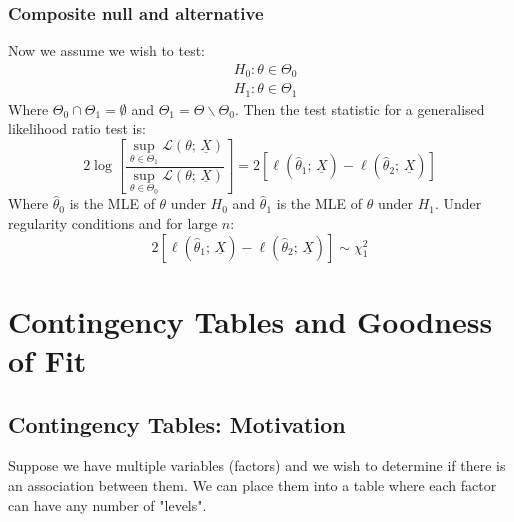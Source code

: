 \documentclass[12pt]{article}
\begin{document}
\subsubsection{Composite null and alternative}
Now we assume we wish to test:
\begin{align*}
    &H_0:\theta\in\Theta_0 \\
    &H_1:\theta\in\Theta_1
\end{align*}
Where \(\Theta_0\cap\Theta_1=\emptyset\) and \(\Theta_1=\Theta\backslash\Theta_0\). Then the test statistic for a generalised likelihood ratio test is:
\[2\log\left[\frac{\sup_{\theta\in\Theta_1}\mathcal{L}(\theta;\,\underline{X})}{\sup_{\theta\in\Theta_0}\mathcal{L}(\theta;\,\underline{X})}\right]=2[\ell(\hat{\theta}_1;\,\underline{X})-\ell(\hat{\theta}_2;\,\underline{X})]\]
Where \(\hat{\theta}_0\) is the MLE of \(\theta\) under \(H_0\) and \(\hat{\theta}_1\) is the MLE of \(\theta\) under \(H_1\). Under regularity conditions and for large \(n\):
\[2[\ell(\hat{\theta}_1;\,\underline{X})-\ell(\hat{\theta}_2;\,\underline{X})]\sim\chi^2_1\]
\clearpage
\section{Contingency Tables and Goodness of Fit}
\subsection{Contingency Tables: Motivation}
Suppose we have multiple variables (factors) and we wish to determine if there is an association between them. We can place them into a table where each factor can have any number of "levels".
\end{document}
